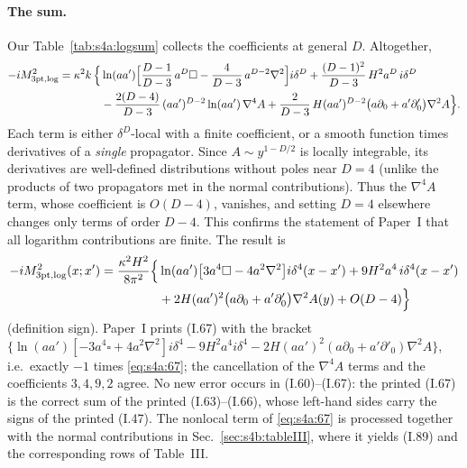 \documentclass[aps,prd,onecolumn,10pt,nofootinbib,floatfix]{revtex4-2}
\newcommand{\PI}{Paper~I}
\newcommand{\eqI}[1]{(I.#1)}
\begin{document}
\paragraph*{The sum.}
Our Table~\ref{tab:s4a:logsum} collects the coefficients at general $D$. Altogether,
\begin{equation}
\begin{aligned}
-iM^2_{\rm 3pt,log}=\kappa^2k\,\Big\{&\ln(aa')\Big[\frac{D-1}{D-3}\,a^D\square-\frac{4}{D-3}\,a^{D-2}\nabla^2\Big]i\delta^D
+\frac{(D-1)^2}{D-3}\,H^2a^D\,i\delta^D\\
&-\frac{2(D-4)}{D-3}\,(aa')^{D-2}\ln(aa')\,\nabla^4A
+\frac{2}{D-3}\,H(aa')^{D-2}\big(a\partial_0+a'\partial'_0\big)\nabla^2A\Big\}.
\end{aligned}
\label{eq:s4a:67D}
\end{equation}
Each term is either $\delta^D$-local with a finite coefficient, or a smooth function times derivatives
of a \emph{single} propagator. Since $A\sim y^{1-D/2}$ is locally integrable, its derivatives are
well-defined distributions without poles near $D=4$ (unlike the products of two propagators met in the
normal contributions). Thus the $\nabla^4A$ term, whose coefficient is $O(D-4)$, vanishes, and setting
$D=4$ elsewhere changes only terms of order $D-4$. This confirms the statement of \PI{} that all
logarithm contributions are finite. The result is
\begin{equation}
\begin{aligned}
-iM^2_{\rm 3pt,log}(x;x')=\frac{\kappa^2H^2}{8\pi^2}\Big\{&\ln(aa')\big[3a^4\square-4a^2\nabla^2\big]i\delta^4(x-x')
+9H^2a^4\,i\delta^4(x-x')\\
&+2H(aa')^2\big(a\partial_0+a'\partial'_0\big)\nabla^2A(y)+O(D-4)\Big\}
\end{aligned}
\label{eq:s4a:67}
\end{equation}
(definition sign). \PI{} prints \eqI{67} with the bracket $\{\ln(aa')[-3a^4\square+4a^2\nabla^2]i\delta^4-9H^2a^4i\delta^4
-2H(aa')^2(a\partial_0+a'\partial'_0)\nabla^2A\}$, i.e.\ exactly $-1$ times \eqref{eq:s4a:67}; the cancellation of
the $\nabla^4A$ terms and the coefficients $3,4,9,2$ agree. No new error occurs in \eqI{60}--\eqI{67}:
the printed \eqI{67} is the correct sum of the printed \eqI{63}--\eqI{66}, whose left-hand sides carry
the signs of the printed \eqI{47}. The nonlocal term of \eqref{eq:s4a:67} is processed together with
the normal contributions in Sec.~\ref{sec:s4b:tableIII}, where it yields \eqI{89} and the
corresponding rows of Table~III.
\end{document}
